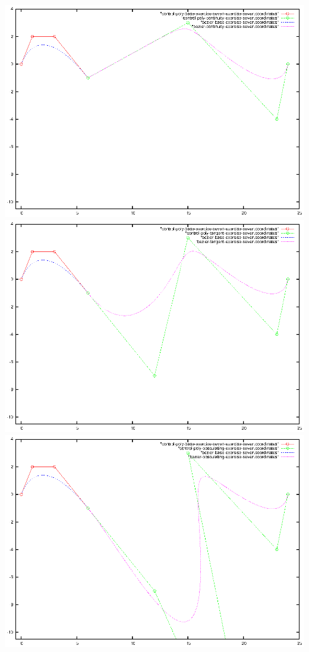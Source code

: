 \documentclass{article}
\begin{document}
\includegraphics{bezier-deCasteljau-curves/exercise-seven-continuity}
\includegraphics{bezier-deCasteljau-curves/exercise-seven-tangent}
\includegraphics{bezier-deCasteljau-curves/exercise-seven-obsculating}
\end{document}
